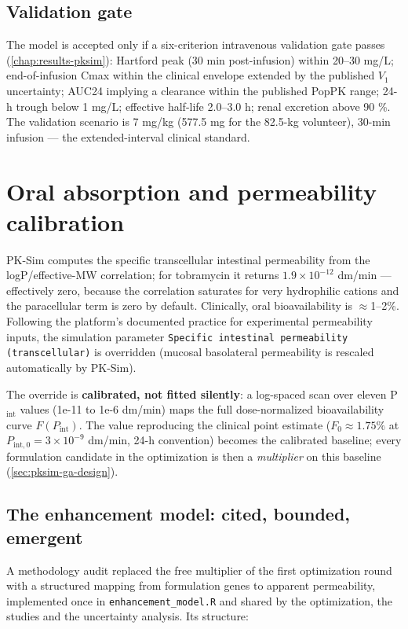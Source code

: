 \subsection{Validation gate}
\label{sec:pksim-gate-design}
The model is accepted only if a six-criterion intravenous validation gate passes (\cref{chap:results-pksim}): Hartford peak (30 min post-infusion) within 20--30 mg/L; end-of-infusion Cmax within the clinical envelope extended by the published $V_1$ uncertainty; AUC24 implying a clearance within the published PopPK range; 24-h trough below 1 mg/L; effective half-life 2.0--3.0 h; renal excretion above 90 \%. The validation scenario is 7 mg/kg (577.5 mg for the 82.5-kg volunteer), 30-min infusion --- the extended-interval clinical standard.

\section{Oral absorption and permeability calibration}
\label{sec:pksim-oral-calibration}

PK-Sim computes the specific transcellular intestinal permeability from the logP/effective-MW correlation; for tobramycin it returns $1.9\times10^{-12}$ dm/min --- effectively zero, because the correlation saturates for very hydrophilic cations and the paracellular term is zero by default. Clinically, oral bioavailability is $\approx$1--2\%. Following the platform's documented practice for experimental permeability inputs, the simulation parameter \texttt{Specific intestinal permeability (transcellular)} is overridden (mucosal basolateral permeability is rescaled automatically by PK-Sim).

The override is \textbf{calibrated, not fitted silently}: a log-spaced scan over eleven P$_{\mathrm{int}}$ values (1e-11 to 1e-6 dm/min) maps the full dose-normalized bioavailability curve $F(P_{\mathrm{int}})$. The value reproducing the clinical point estimate ($F_0 \approx 1.75\%$ at $P_{\mathrm{int},0} = 3\times10^{-9}$ dm/min, 24-h convention) becomes the calibrated baseline; every formulation candidate in the optimization is then a \emph{multiplier} on this baseline (\cref{sec:pksim-ga-design}).

\subsection{The enhancement model: cited, bounded, emergent}
\label{sec:methods-pksim-enhancement}

A methodology audit replaced the free multiplier of the first optimization round with a structured mapping from formulation genes to apparent permeability, implemented once in \texttt{enhancement\_model.R} and shared by the optimization, the studies and the uncertainty analysis. Its structure:

